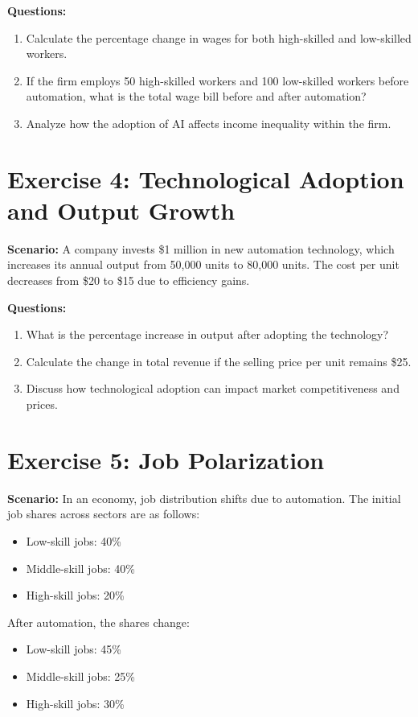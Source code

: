 \documentclass[12pt]{article}
\begin{document}
\textbf{Questions:}
\begin{enumerate}
    \item Calculate the percentage change in wages for both high-skilled and low-skilled workers.
    \item If the firm employs 50 high-skilled workers and 100 low-skilled workers before automation, what is the total wage bill before and after automation?
    \item Analyze how the adoption of AI affects income inequality within the firm.
\end{enumerate}

\section*{Exercise 4: Technological Adoption and Output Growth}
\textbf{Scenario:} A company invests \$1 million in new automation technology, which increases its annual output from 50,000 units to 80,000 units. The cost per unit decreases from \$20 to \$15 due to efficiency gains.

\textbf{Questions:}
\begin{enumerate}
    \item What is the percentage increase in output after adopting the technology?
    \item Calculate the change in total revenue if the selling price per unit remains \$25.
    \item Discuss how technological adoption can impact market competitiveness and prices.
\end{enumerate}

\section*{Exercise 5: Job Polarization}
\textbf{Scenario:} In an economy, job distribution shifts due to automation. The initial job shares across sectors are as follows:
\begin{itemize}
    \item Low-skill jobs: 40\%
    \item Middle-skill jobs: 40\%
    \item High-skill jobs: 20\%
\end{itemize}

After automation, the shares change:
\begin{itemize}
    \item Low-skill jobs: 45\%
    \item Middle-skill jobs: 25\%
    \item High-skill jobs: 30\%
\end{itemize}
\end{document}
